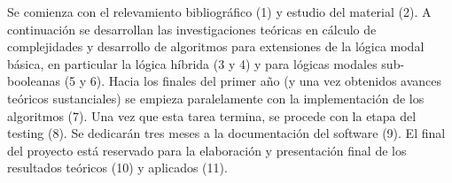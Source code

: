 Se comienza con el relevamiento bibliogr\'afico (1) y estudio del
material (2). A continuaci\'on se desarrollan las investigaciones
te\'oricas en c\'alculo de complejidades y desarrollo de algoritmos para
extensiones de la l\'ogica modal b\'asica, en particular la l\'ogica
h\'ibrida (3 y 4) y para l\'ogicas modales sub-booleanas (5 y 6). Hacia los finales del primer a\~no (y una vez obtenidos avances te\'oricos sustanciales) se empieza paralelamente con la implementaci\'on de los algoritmos (7). Una vez que esta tarea termina, se procede con la etapa del testing (8). Se dedicar\'an tres meses a la documentaci\'on del software (9). El final del proyecto est\'a reservado para la elaboraci\'on y presentaci\'on final de los resultados te\'oricos (10) y aplicados (11).

